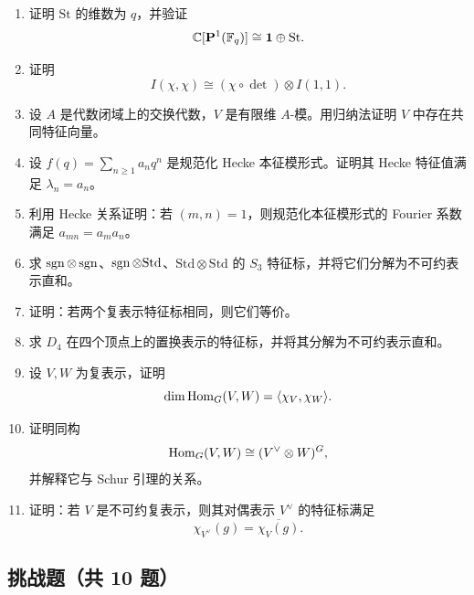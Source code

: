 \begin{enumerate}[label={\textbf{习题8.\arabic*.}}, wide=0pt, leftmargin=3.2em]
\item \medium 证明 $\mathrm{St}$ 的维数为 $q$，并验证
\[
\mathbb{C}[\mathbf{P}^1(\mathbb{F}_q)]\cong \mathbf{1}\oplus \mathrm{St}.
\]

\item \medium 证明
\[
I(\chi,\chi)\cong (\chi\circ\det)\otimes I(1,1).
\]

\item \medium 设 $A$ 是代数闭域上的交换代数，$V$ 是有限维 $A$-模。用归纳法证明 $V$ 中存在共同特征向量。

\item \medium 设 $f(q)=\sum_{n\ge 1}a_nq^n$ 是规范化 Hecke 本征模形式。证明其 Hecke 特征值满足 $\lambda_n=a_n$。

\item \medium 利用 Hecke 关系证明：若 $(m,n)=1$，则规范化本征模形式的 Fourier 系数满足 $a_{mn}=a_ma_n$。

\item \medium 求 $\operatorname{sgn}\otimes \operatorname{sgn}$、$\operatorname{sgn}\otimes \mathrm{Std}$、$\mathrm{Std}\otimes \mathrm{Std}$ 的 $S_3$ 特征标，并将它们分解为不可约表示直和。

\item \medium 证明：若两个复表示特征标相同，则它们等价。

\item \medium 求 $D_4$ 在四个顶点上的置换表示的特征标，并将其分解为不可约表示直和。

\item \medium 设 $V,W$ 为复表示，证明
\[
\dim \mathrm{Hom}_G(V,W)=\langle \chi_V, \chi_W \rangle.
\]

\item \medium 证明同构
\[
\mathrm{Hom}_G(V,W)\cong (V^{\vee}\otimes W)^G,
\]
并解释它与 Schur 引理的关系。

\item \medium 证明：若 $V$ 是不可约复表示，则其对偶表示 $V^{\vee}$ 的特征标满足
\[
\chi_{V^{\vee}}(g)=\overline{\chi_V(g)}.
\]
\end{enumerate}

\subsection*{挑战题（共 10 题）}


